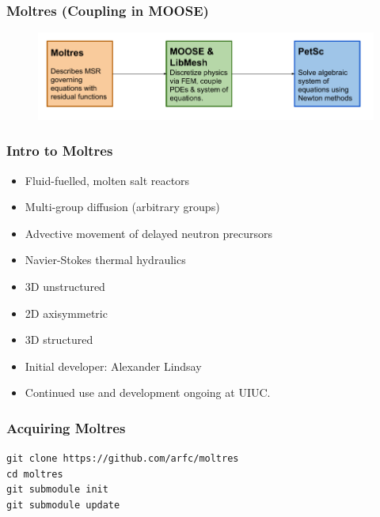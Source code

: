 \begin{frame}
        \frametitle{Moltres (Coupling in MOOSE)}
        \begin{center}
  \begin{figure}
   \vspace{-0.05in}
   \includegraphics[width=1.1\textwidth]{./images/moltres-moose-diag.png}
    \end{figure}
        \end{center}
\end{frame}

\begin{frame}
        \frametitle{Intro to Moltres}
        \begin{itemize}  
                \item Fluid-fuelled, molten salt reactors
                \item Multi-group diffusion (arbitrary groups)
                \item Advective movement of delayed neutron precursors
                \item Navier-Stokes thermal hydraulics
                \item 3D unstructured
                \item 2D axisymmetric
                \item 3D structured 
                \item Initial developer: Alexander Lindsay \cite{lindsay_introduction_2018}
                \item Continued use and development ongoing at UIUC.
        \end{itemize}
\end{frame}


\begin{frame}
        \frametitle{Acquiring Moltres}
             \texttt{git clone https://github.com/arfc/moltres}\\
        \texttt{cd moltres}\\
        \texttt{git submodule init}\\
        \texttt{git submodule update}\\
\end{frame}

